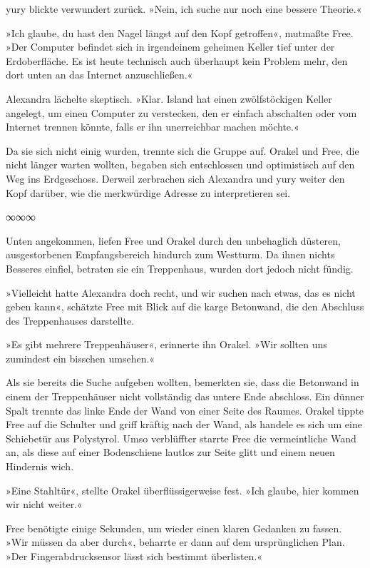 yury blickte verwundert zurück. »Nein, ich suche nur noch eine bessere Theorie.«

»Ich glaube, du hast den Nagel längst auf den Kopf getroffen«, mutmaßte Free. »Der Computer befindet sich in irgendeinem geheimen Keller tief unter der Erdoberfläche. Es ist heute technisch auch überhaupt kein Problem mehr, den dort unten an das Internet anzuschließen.«

Alexandra lächelte skeptisch. »Klar. Island hat einen zwölfstöckigen Keller angelegt, um einen Computer zu verstecken, den er einfach abschalten oder vom Internet trennen könnte, falls er ihn unerreichbar machen möchte.«

Da sie sich nicht einig wurden, trennte sich die Gruppe auf. Orakel und Free, die nicht länger warten wollten, begaben sich entschlossen und optimistisch auf den Weg ins Erdgeschoss. Derweil zerbrachen sich Alexandra und yury weiter den Kopf darüber, wie die merkwürdige Adresse zu interpretieren sei.

\begin{center}
∞∞∞
\end{center}

Unten angekommen, liefen Free und Orakel durch den unbehaglich düsteren, ausgestorbenen Empfangsbereich hindurch zum Westturm. Da ihnen nichts Besseres einfiel, betraten sie ein Treppenhaus, wurden dort jedoch nicht fündig.

»Vielleicht hatte Alexandra doch recht, und wir suchen nach etwas, das es nicht geben kann«, schätzte Free mit Blick auf die karge Betonwand, die den Abschluss des Treppenhauses darstellte.

»Es gibt mehrere Treppenhäuser«, erinnerte ihn Orakel. »Wir sollten uns zumindest ein bisschen umsehen.«

Als sie bereits die Suche aufgeben wollten, bemerkten sie, dass die Betonwand in einem der Treppenhäuser nicht vollständig das untere Ende abschloss. Ein dünner Spalt trennte das linke Ende der Wand von einer Seite des Raumes. Orakel tippte Free auf die Schulter und griff kräftig nach der Wand, als handele es sich um eine Schiebetür aus Polystyrol. Umso verblüffter starrte Free die vermeintliche Wand an, als diese auf einer Bodenschiene lautlos zur Seite glitt und einem neuen Hindernis wich.

»Eine Stahltür«, stellte Orakel überflüssigerweise fest. »Ich glaube, hier kommen wir nicht weiter.«

Free benötigte einige Sekunden, um wieder einen klaren Gedanken zu fassen. »Wir müssen da aber durch«, beharrte er dann auf dem ursprünglichen Plan. »Der Fingerabdrucksensor lässt sich bestimmt überlisten.«

